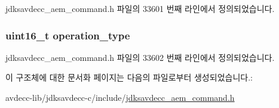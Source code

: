 jdksavdecc\+\_\+aem\+\_\+command.\+h 파일의 33601 번째 라인에서 정의되었습니다.

\subsubsection[{\texorpdfstring{operation\+\_\+type}{operation_type}}]{\setlength{\rightskip}{0pt plus 5cm}uint16\+\_\+t operation\+\_\+type}\hypertarget{structjdksavdecc__aem__command__start__operation_ab2dfcd06646c4907feb4ec8153ba7b79}{}\label{structjdksavdecc__aem__command__start__operation_ab2dfcd06646c4907feb4ec8153ba7b79}


jdksavdecc\+\_\+aem\+\_\+command.\+h 파일의 33602 번째 라인에서 정의되었습니다.



이 구조체에 대한 문서화 페이지는 다음의 파일로부터 생성되었습니다.\+:\begin{DoxyCompactItemize}
\item 
avdecc-\/lib/jdksavdecc-\/c/include/\hyperlink{jdksavdecc__aem__command_8h}{jdksavdecc\+\_\+aem\+\_\+command.\+h}\end{DoxyCompactItemize}
